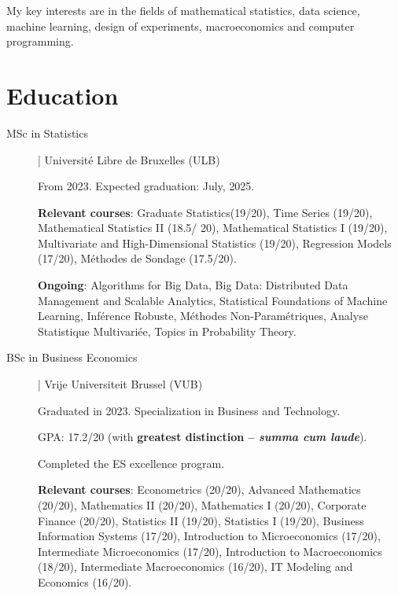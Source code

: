 \documentclass[12pt]{article}
\newcommand{\mycolor}{mySlateBlue}
\newcommand{\thesectionicon}{}
\newcommand{\sectionicon}[1]{\renewcommand{\thesectionicon}{#1}}
\begin{document}
\vspace{1.5ex}
My key interests are in the fields of mathematical statistics, data science, machine learning, design of experiments, macroeconomics and computer programming.

\sectionicon{\faGraduationCap}
\section{Education}

\begin{description}

\item[\textcolor{\mycolor}{MSc in Statistics}] | Université Libre de Bruxelles (ULB)

From 2023. Expected graduation: July, 2025.

\textbf{Relevant courses}: Graduate Statistics(19/20), Time Series (19/20), Mathematical Statistics II (18.5/ 20), Mathematical Statistics I (19/20), Multivariate and High-Dimensional Statistics (19/20), Regression Models (17/20), Méthodes de Sondage (17.5/20).
  
\textbf{Ongoing}: Algorithms for Big Data, Big Data: Distributed Data Management and Scalable Analytics, Statistical Foundations of Machine Learning, Inférence Robuste, Méthodes Non-Paramétriques, Analyse Statistique Multivariée, Topics in Probability Theory.

\vspace{5ex}

\item[\textcolor{\mycolor}{BSc in Business Economics}] | Vrije Universiteit Brussel (VUB)

Graduated in 2023. Specialization in Business and Technology.
  
GPA: 17.2/20 (with \textbf{greatest distinction -- \emph{summa cum laude}}).

Completed the ES excellence program.  

\textbf{Relevant courses}: Econometrics (20/20), Advanced Mathematics (20/20), Mathematics II (20/20), Mathematics I (20/20), Corporate Finance (20/20), Statistics II (19/20), Statistics I (19/20), Business Information Systems (17/20), Introduction to Microeconomics (17/20), Intermediate Microeconomics (17/20), Introduc\-tion to Macroeconomics (18/20), Intermediate Macroeconomics (16/20), IT Modeling and Economics (16/20).


\end{description}
\end{document}
